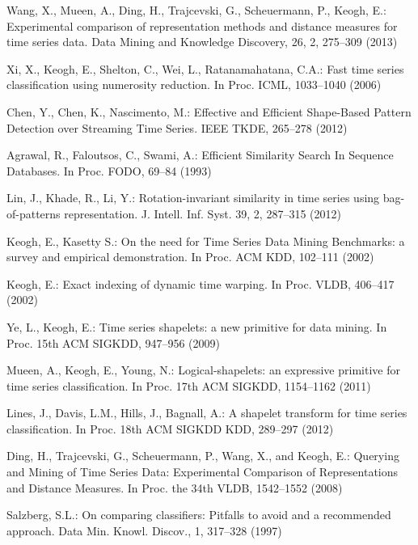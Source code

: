 \documentclass{llncs}
\begin{document}
\begin{thebibliography}{5}


Wang, X., Mueen, A., Ding, H., Trajcevski, G., Scheuermann, P., Keogh, E.:
Experimental comparison of representation methods and distance measures for time series data.
Data Mining and Knowledge Discovery, 26, 2, 275--309 (2013)

Xi, X., Keogh, E., Shelton, C., Wei, L., Ratanamahatana, C.A.:
Fast time series classification using numerosity reduction. 
In Proc. ICML, 1033--1040 (2006)

Chen, Y., Chen, K., Nascimento, M.:
Effective and Efficient Shape-Based Pattern Detection over Streaming Time Series. 
IEEE TKDE, 265--278 (2012)

Agrawal, R., Faloutsos, C., Swami, A.:
Efficient Similarity Search In Sequence Databases.
In Proc. FODO, 69--84 (1993)

Lin, J., Khade, R., Li, Y.:
Rotation-invariant similarity in time series using bag-of-patterns representation. 
J. Intell. Inf. Syst. 39, 2, 287--315 (2012)

Keogh, E., Kasetty S.:
On the need for Time Series Data Mining Benchmarks: a survey and empirical demonstration.
In Proc. ACM KDD, 102--111 (2002)

Keogh, E.:
Exact indexing of dynamic time warping. 
In Proc. VLDB, 406--417 (2002)

Ye, L., Keogh, E.:
Time series shapelets: a new primitive for data mining.
In Proc. 15th ACM SIGKDD, 947--956 (2009)

Mueen, A., Keogh, E., Young, N.:
Logical-shapelets: an expressive primitive for time series classification.
In Proc. 17th ACM SIGKDD, 1154--1162 (2011)

Lines, J., Davis, L.M., Hills, J., Bagnall, A.:
A shapelet transform for time series classification. 
In Proc. 18th ACM SIGKDD KDD, 289--297 (2012)

Ding, H., Trajcevski, G., Scheuermann, P., Wang, X., and Keogh, E.:
Querying and Mining of Time Series Data: Experimental Comparison of Representations and Distance
Measures. 
In Proc. the 34th VLDB, 1542--1552 (2008)

Salzberg, S.L.:
On comparing classifiers: Pitfalls to avoid and a recommended approach. 
Data Min. Knowl. Discov., 1, 317--328 (1997)


\end{thebibliography}
\end{document}
